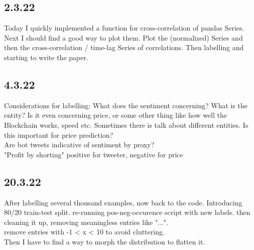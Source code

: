 \subsection{2.3.22}
Today I quickly implemented a function for cross-correlation of pandas Series. Next I should find a good way to plot them. Plot the (normalized) Series and then the cross-correlation / time-lag Series of correlations. Then labelling and starting to write the paper.

\subsection{4.3.22}
Considerations for labelling: What does the sentiment concerning? What is the entity? Is it even concerning price, or some other thing like how well the Blockchain works, speed etc. Sometimes there is talk about different entities. Is this important for price prediction? \\
Are bot tweets indicative of sentiment by proxy? \\
"Profit by shorting" positive for tweeter, negative for price \\

\subsection{20.3.22}
After labelling several thousand examples, now back to the code. Introducing 80/20 train-test split. re-running pos-neg-occurence script with new labels. then cleaning it up, removing meaningless entries like "...". \\
remove entries with -1 < x < 10 to avoid cluttering. \\
Then I have to find a way to morph the distribution to flatten it.